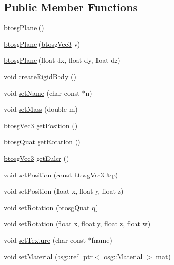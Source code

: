 \subsection*{Public Member Functions}
\begin{DoxyCompactItemize}
\item 
\hyperlink{classbtosgPlane_a363737cea03a886470a1a46003706268}{btosg\+Plane} ()
\item 
\hyperlink{classbtosgPlane_a56b020a475b1c955fc50d5c1f6d4d754}{btosg\+Plane} (\hyperlink{classbtosgVec3}{btosg\+Vec3} v)
\item 
\hyperlink{classbtosgPlane_a295ebe4cb55a2786764c7840d10895f4}{btosg\+Plane} (float dx, float dy, float dz)
\item 
void \hyperlink{classbtosgPlane_a0e6812c186ed1fa128dccf7cd2e525a6}{create\+Rigid\+Body} ()
\item 
void \hyperlink{classbtosgObject_ab06a1b3f357209214c6440cd5746523e}{set\+Name} (char const $\ast$n)
\item 
void \hyperlink{classbtosgObject_a91da93c82d48b86192f0cbb16054fe57}{set\+Mass} (double m)
\item 
\hyperlink{classbtosgVec3}{btosg\+Vec3} \hyperlink{classbtosgObject_a3dadd5da8f2a312e44a039446b93d4cd}{get\+Position} ()
\item 
\hyperlink{classbtosgQuat}{btosg\+Quat} \hyperlink{classbtosgObject_a3b825999ad3a51bde743d4085ff19dae}{get\+Rotation} ()
\item 
\hyperlink{classbtosgVec3}{btosg\+Vec3} \hyperlink{classbtosgObject_a2019ec63bde02b72600450c7c985e77a}{get\+Euler} ()
\item 
void \hyperlink{classbtosgObject_ace6b51040b7ddce90818174200cc6074}{set\+Position} (const \hyperlink{classbtosgVec3}{btosg\+Vec3} \&p)
\item 
void \hyperlink{classbtosgObject_adb9f2cff0faf66dc252cd7c97b11ac84}{set\+Position} (float x, float y, float z)
\item 
void \hyperlink{classbtosgObject_a6365748d5506bb9da31907c9988071fa}{set\+Rotation} (\hyperlink{classbtosgQuat}{btosg\+Quat} q)
\item 
void \hyperlink{classbtosgObject_a4d21ca59b944fd26644db35d3e9ba67a}{set\+Rotation} (float x, float y, float z, float w)
\item 
void \hyperlink{classbtosgObject_aff54acbc7c66811efb0cf2838107a241}{set\+Texture} (char const $\ast$fname)
\item 
void \hyperlink{classbtosgObject_a6ab7b9e0553dab398b980637788b56a8}{set\+Material} (osg\+::ref\+\_\+ptr$<$ osg\+::\+Material $>$ mat)

\end{DoxyCompactItemize}
